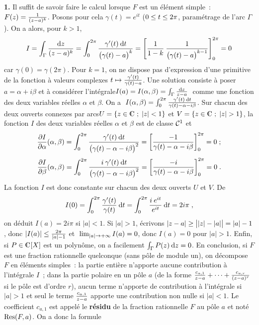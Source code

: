 \documentclass{article}
\begin{document}
\msk
\cl{- - - - - - - - - - - - - - - - - - - - - - - - - - - - - -}
\msk

{\bf 1.} Il suffit de savoir faire le calcul lorsque $F$ est un \'el\'ement simple~: $F(z)={1\over(z-a)^k}$. Posons pour cela $\gamma(t)=e^{it}$ ($0\leq t\leq 2\pi$, param\'etrage de l'arc $\Gamma$). On a alors, pour $k>1$,\vv
$$I=\int_{\Gamma}{{\rm d}z\over(z-a)^k}=\int_0^{2\pi}{\gamma'(t)\>{\rm d}t\over\big(\gamma(t)-a\big)^k}=\left[{1\over1-k}\>{1\over\big(\gamma(t)-a\big)^{k-1}}\right]_0^{2\pi}=0$$
car $\gamma(0)=\gamma(2\pi)$.\msk\sect
Pour $k=1$, on ne dispose pas d'expression d'une primitive de la fonction \`a valeurs complexes $t\mapsto{\gamma'(t)\over\gamma(t)-a}$. Une solution consiste \`a poser $a=\alpha+i\beta$ et \`a consid\'erer l'int\'egrale\break $I(a)=I(\alpha,\beta)=\int_{\Gamma}{{\rm d}z\over z-a}\;$ comme une fonction des deux variables r\'eelles $\alpha$ et $\beta$. On a $\;I(\alpha,\beta)=\int_0^{2\pi}{\gamma'(t)\>{\rm d}t\over\gamma(t)-\alpha-i\beta}$. Sur chacun des deux ouverts connexes par arcs\break $U=\{z\in\cmat\;;\;|z|<1\}$ et $V=\{z\in\cmat\;;\;|z|>1\}$, la fonction $I$ des deux variables r\'eelles $\alpha$ et $\beta$ est de classe ${\cal C}^1$ et\vv
$${\partial I\over\partial\alpha}(\alpha,\beta)=\int_0^{2\pi}{\gamma'(t)\>{\rm d}t\over\big(\gamma(t)-\alpha-i\beta\big)^2}=\left[{-1\over\gamma(t)-\alpha-i\beta}\right]_0^{2\pi}=0\;;$$
$${\partial I\over\partial\beta}(\alpha,\beta)=\int_0^{2\pi}{i\>\gamma'(t)\>{\rm d}t\over\big(\gamma(t)-\alpha-i\beta\big)^2}=\left[{-i\over\gamma(t)-\alpha-i\beta}\right]_0^{2\pi}=0\;.$$
La fonction $I$ est donc constante sur chacun des deux ouverts $U$ et $V$. De\vv
$$I(0)=\int_0^{2\pi}{\gamma'(t)\over\gamma(t)}\>{\rm d}t=\int_0^{2\pi}{i\>e^{it}\over e^{it}}\>{\rm d}t=2i\pi\;,$$
on d\'eduit $I(a)=2i\pi$ si $|a|<1$.\ssk\new
Si $|a|>1$, \'ecrivons $|z-a|\geq\big||z|-|a|\big|=|a|-1$, donc $|I(a)|\leq{2\pi\over|a|-1}$ et $\;\lim_{|a|\rightarrow+\infty}I(a)=0$, donc $I(a)=0$ pour $|a|>1$.\msk\sect
Enfin, si $P\in\cmat[X]$ est un polyn\^ome, on a facilement $\int_{\Gamma}P(z)\>{\rm d}z=0$.\msk\sect
En conclusion, si $F$ est une fraction rationnelle quelconque (sans p\^ole de module un), on d\'ecompose $F$ en \'el\'ements simples~: la partie enti\`ere n'apporte aucune contribution \`a l'int\'egrale $I$~; dans la partie polaire en un p\^ole $a$ (de la forme ${c_{a,1}\over z-a}+\cdots+{c_{a,r}\over(z-a)^r}$ si le p\^ole est d'ordre $r$), aucun terme n'apporte de contribution \`a l'int\'egrale si $|a|>1$ et seul le terme ${c_{a,1}\over z-a}$ apporte une contribution non nulle si $|a|<1$. Le coefficient $c_{a,1}$ est appel\'e le {\bf r\'esidu} de la fraction rationnelle $F$ au p\^ole $a$ et not\'e ${\rm Res}(F,a)$. On a donc la formule\vv
\end{document}
